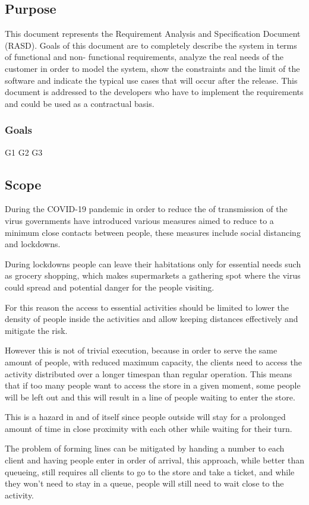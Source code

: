 
\subsection{Purpose}
{ \color{green} %
This document represents the Requirement Analysis and Specification Document (RASD).
Goals of this document are to completely describe the system in terms of functional and non-
functional requirements, analyze the real needs of the customer in order to model the system,
show the constraints and the limit of the software and indicate the typical use cases that will
occur after the release. This document is addressed to the developers who have to implement
the requirements and could be used as a contractual basis.
}
\subsubsection{Goals}

G1
G2
G3

\subsection{Scope}
During the COVID-19 pandemic in order to reduce the of transmission of the virus governments have introduced various measures aimed to reduce to a minimum close contacts between people, these measures include social distancing and lockdowns.

During lockdowns people can leave their habitations only for essential needs such as grocery shopping, which makes supermarkets a gathering spot where the virus could spread and potential danger for the people visiting.

For this reason the access to essential activities should be limited to lower the density of people inside the activities and allow keeping distances effectively and mitigate the risk.

However this is not of trivial execution, because in order to serve the same amount of people, with reduced maximum capacity, the clients need to access the activity distributed over a longer timespan than regular operation. This means that if too many people want to access the store in a given moment, some people will be left out and this will result in a line of people waiting to enter the store.

This is a hazard in and of itself since people outside will stay for a prolonged amount of time in close proximity with each other while waiting for their turn.

The problem of forming lines can be mitigated by handing a number to each client and having people enter in order of arrival, this approach, while better than queueing, still requires all clients to go to the store and take a ticket, and while they won't need to stay in a queue, people will still need to wait close to the activity.

